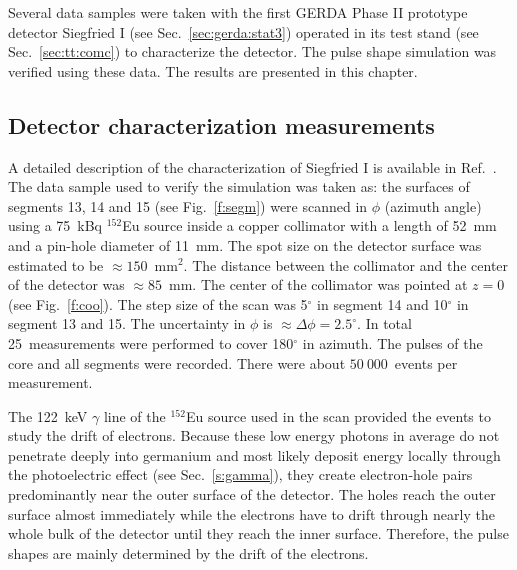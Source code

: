 \documentclass[epj]{svjour}
\begin{document}
Several data samples were taken with the first GERDA Phase II
prototype detector Siegfried I (see Sec.~\ref{sec:gerda:stat3})
operated in its test stand (see Sec.~\ref{sec:tt:comc}) to
characterize the detector. The pulse shape simulation was verified
using these data. The results are presented in this chapter.
%

\subsection{Detector characterization measurements}
\label{s:char}
A detailed description of the characterization of Siegfried I is
available in Ref.~\cite{Sie07}. The data sample used to verify the
simulation was taken as: the surfaces of segments 13, 14 and 15 (see
Fig.~\ref{f:segm}) were scanned in $\phi$ (azimuth angle) using a
75~kBq $^{152}$Eu source inside a copper collimator with a length of
52~mm and a pin-hole diameter of 11~mm. The spot size on the detector
surface was estimated to be $\approx 150$~mm$^{2}$. The distance
between the collimator and the center of the detector was $\approx
85$~mm. The center of the collimator was pointed at $z = 0$ (see
Fig.~\ref{f:coo}).  The step size of the scan was 5$^{\circ}$ in
segment 14 and 10$^{\circ}$ in segment 13 and 15. The uncertainty in
$\phi$ is $\approx \Delta \phi=2.5^{\circ}$. In total 25~measurements
were performed to cover 180$^{\circ}$ in azimuth. The pulses of the
core and all segments were recorded. There were about $50\ 000$~events
per measurement.

The 122~keV $\gamma$ line of the $^{152}$Eu source used in the scan
provided the events to study the drift of electrons. Because these low
energy photons in average do not penetrate deeply into germanium and
most likely deposit energy locally through the photoelectric effect
(see Sec.~\ref{s:gamma}), they create electron-hole pairs
predominantly near the outer surface of the detector. The holes reach
the outer surface almost immediately while the electrons have to drift
through nearly the whole bulk of the detector until they reach the
inner surface. Therefore, the pulse shapes are mainly determined by
the drift of the electrons.
\end{document}
